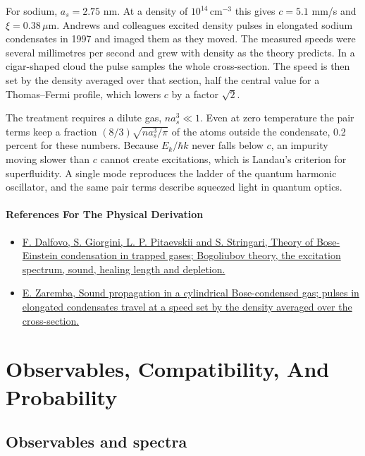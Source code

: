\documentclass[11pt,oneside]{book}
\begin{document}
For sodium, \(a_s=2.75\) nm. At a density of \(10^{14}\,\mathrm{cm}^{-3}\) this gives \(c=5.1\) mm/s and \(\xi=0.38\,\mu\mathrm m\). Andrews and colleagues excited density pulses in elongated sodium condensates in 1997 and imaged them as they moved. The measured speeds were several millimetres per second and grew with density as the theory predicts. In a cigar-shaped cloud the pulse samples the whole cross-section. The speed is then set by the density averaged over that section, half the central value for a Thomas--Fermi profile, which lowers \(c\) by a factor \(\sqrt2\).

The treatment requires a dilute gas, \(na_s^3\ll1\). Even at zero temperature the pair terms keep a fraction \((8/3)\sqrt{na_s^3/\pi}\) of the atoms outside the condensate, 0.2 percent for these numbers. Because \(E_k/\hbar k\) never falls below \(c\), an impurity moving slower than \(c\) cannot create excitations, which is Landau's criterion for superfluidity. A single mode reproduces the ladder of the quantum harmonic oscillator, and the same pair terms describe squeezed light in quantum optics.

\subsection*{References For The Physical Derivation}
\begin{itemize}
\item \href{https://arxiv.org/abs/cond-mat/9806038}{F. Dalfovo, S. Giorgini, L. P. Pitaevskii and S. Stringari, Theory of Bose-Einstein condensation in trapped gases; Bogoliubov theory, the excitation spectrum, sound, healing length and depletion.}
\item \href{https://arxiv.org/abs/cond-mat/9708237}{E. Zaremba, Sound propagation in a cylindrical Bose-condensed gas; pulses in elongated condensates travel at a speed set by the density averaged over the cross-section.}
\end{itemize}





\part{Observables, Compatibility, And Probability}

\chapter{Observables and spectra}
\end{document}
